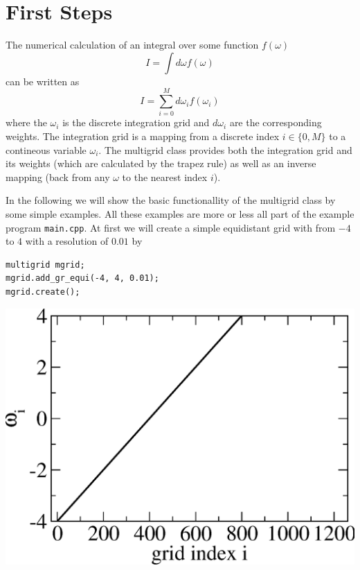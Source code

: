 \section{First Steps}
The numerical calculation of an integral over some function $f(\omega)$
\begin{equation} \label{eqn:integral}
	I=\int d\omega f(\omega)
\end{equation}
can be written as
\begin{equation} \label{eqn:nintegral}
	I=\sum_{i=0}^M d\omega_i f(\omega_i)
\end{equation}
where the $\omega_i$ is the discrete integration grid and $d\omega_i$ are the corresponding weights. The integration grid is a mapping from a discrete index $i\in\{0,M\}$ to a contineous variable $\omega_i$. The multigrid class provides both the integration grid and its weights (which are calculated by the trapez rule) as well as an inverse mapping (back from any $\omega$ to the nearest index $i$).

In the following we will show the basic functionallity of the multigrid class by some simple examples. All these examples are more or less all part of the example program \texttt{main.cpp}. At first we will create a simple equidistant grid with from $-4$ to $4$ with a resolution of $0.01$ by 

\vspace{1cm}
\noindent\begin{minipage}[l]{0.6\textwidth}
\begin{lstlisting}
multigrid mgrid;
mgrid.add_gr_equi(-4, 4, 0.01);
mgrid.create();
\end{lstlisting}
\end{minipage}
\begin{minipage}[]{0.4\textwidth}
	\includegraphics[width=1.0\textwidth]{pics/multigrid_00.eps}
\end{minipage}

